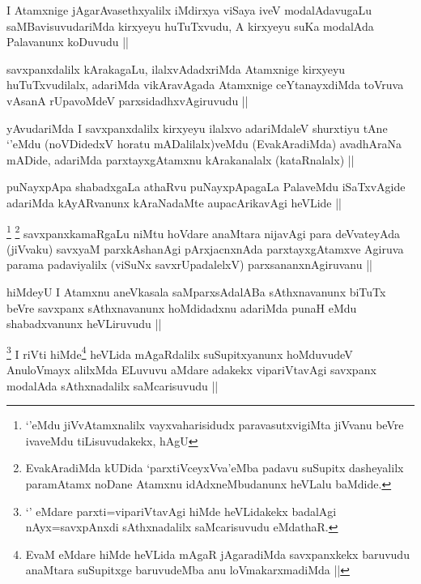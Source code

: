 \begin{artha}
I Atamxnige jAgarAvasethxyalilx iMdirxya viSaya iveV modalAdavugaLu saMBavisuvudariMda kirxyeyu huTuTxvudu, A kirxyeyu suKa modalAda Palavanunx koDuvudu ||
\end{artha}

\begin{artha}
savxpanxdalilx kArakagaLu, ilalxvAdadxriMda Atamxnige kirxyeyu huTuTxvudilalx, adariMda vikAravAgada Atamxnige ceYtanayxdiMda toVruva vAsanA rUpavoMdeV parxsidadhxvAgiruvudu ||
\end{artha}


\begin{artha}
yAvudariMda I savxpanxdalilx kirxyeyu ilalxvo adariMdaleV shurxtiyu tAne `\stext'eMdu (noVDidedxV horatu mADalilalx)veMdu (EvakAradiMda) avadhAraNa mADide, adariMda parxtayxgAtamxnu kArakanalalx (kataRnalalx) ||
\end{artha}

\begin{artha}
puNayxpApa shabadxgaLa athaRvu puNayxpApagaLa PalaveMdu iSaTxvAgide adariMda kAyARvanunx kAraNadaMte aupacArikavAgi heVLide ||
\end{artha}

\begin{artha}
\footnote[1]{`\stext'eMdu jiVvAtamxnalilx vayxvaharisidudx paravasutxvigiMta jiVvanu beVre ivaveMdu tiLisuvudakekx, hAgU}
\footnote[2]{EvakAradiMda kUDida `parxtiVceyxVva'eMba padavu suSupitx dasheyalilx paramAtamx noDane Atamxnu idAdxneMbudanunx heVLalu baMdide.}
savxpanxkamaRgaLu niMtu hoVdare anaMtara nijavAgi para deVvateyAda (jiVvaku)
savxyaM parxkAshanAgi pArxjacnxnAda parxtayxgAtamxve Agiruva parama padaviyalilx (viSuNx savxrUpadalelxV) parxsananxnAgiruvanu ||
\end{artha}


\begin{artha}
hiMdeyU I Atamxnu aneVkasala saMparxsAdalABa sAthxnavanunx biTuTx beVre savxpanx sAthxnavanunx hoMdidadxnu adariMda punaH eMdu shabadxvanunx heVLiruvudu ||
\end{artha}

\begin{artha}
\footnote[2]{`\stext' eMdare parxti=vipariVtavAgi hiMde heVLidakekx badalAgi nAyx=savxpAnxdi sAthxnadalilx saMcarisuvudu eMdathaR.}
I riVti hiMde\footnote[1]{EvaM eMdare hiMde heVLida mAgaR jAgaradiMda savxpanxkekx baruvudu anaMtara suSupitxge baruvudeMba anu loVmakarxmadiMda ||} heVLida mAgaRdalilx suSupitxyanunx hoMduvudeV AnuloVmayx alilxMda ELuvuvu aMdare adakekx vipariVtavAgi savxpanx modalAda sAthxnadalilx saMcarisuvudu ||
\end{artha}

